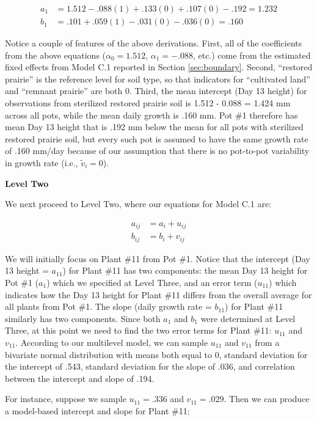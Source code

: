 \documentclass[
]{krantz}
\begin{document}
\begin{align*}
a_{1} & = 1.512-.088(1)+.133(0)+.107(0)-.192 = 1.232 \\
b_{1} & = .101+.059(1)-.031(0)-.036(0) = .160
\end{align*}

Notice a couple of features of the above derivations. First, all of the coefficients from the above equations (\(\alpha_{0}=1.512\), \(\alpha_{1}=-.088\), etc.) come from the estimated fixed effects from Model C.1 reported in Section \ref{sec:boundary}. Second, ``restored prairie'' is the reference level for soil type, so that indicators for ``cultivated land'' and ``remnant prairie'' are both 0. Third, the mean intercept (Day 13 height) for observations from sterilized restored prairie soil is 1.512 - 0.088 = 1.424 mm across all pots, while the mean daily growth is .160 mm. Pot \#1 therefore has mean Day 13 height that is .192 mm below the mean for all pots with sterilized restored prairie soil, but every such pot is assumed to have the same growth rate of .160 mm/day because of our assumption that there is no pot-to-pot variability in growth rate (i.e., \(\tilde{v}_{i}=0\)).

\textbf{Level Two}

We next proceed to Level Two, where our equations for Model C.1 are:

\begin{align*}
a_{ij} & = a_{i}+u_{ij} \\
b_{ij} & = b_{i}+v_{ij}
\end{align*}

We will initially focus on Plant \#11 from Pot \#1. Notice that the intercept (Day 13 height = \(a_{11}\)) for Plant \#11 has two components: the mean Day 13 height for Pot \#1 (\(a_{1}\)) which we specified at Level Three, and an error term (\(u_{11}\)) which indicates how the Day 13 height for Plant \#11 differs from the overall average for all plants from Pot \#1. The slope (daily growth rate = \(b_{11}\)) for Plant \#11 similarly has two components. Since both \(a_{1}\) and \(b_{1}\) were determined at Level Three, at this point we need to find the two error terms for Plant \#11: \(u_{11}\) and \(v_{11}\). According to our multilevel model, we can sample \(u_{11}\) and \(v_{11}\) from a bivariate normal distribution with means both equal to 0, standard deviation for the intercept of .543, standard deviation for the slope of .036, and correlation between the intercept and slope of .194.

For instance, suppose we sample \(u_{11}=.336\) and \(v_{11}=.029\). Then we can produce a model-based intercept and slope for Plant \#11:
\end{document}
